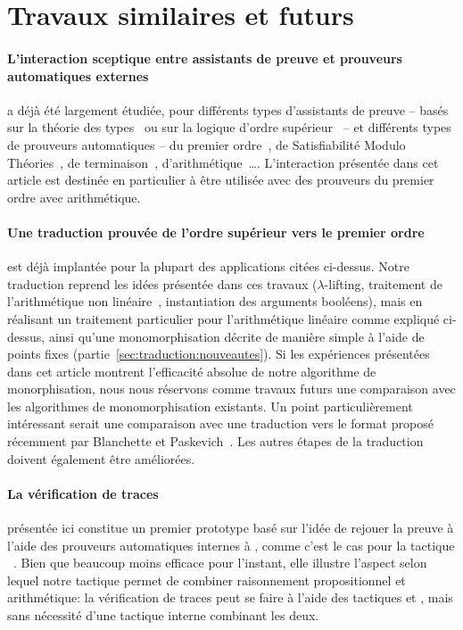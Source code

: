 \section{Travaux similaires et futurs}
\label{sec:similaires}

\paragraph{L'interaction sceptique entre assistants de preuve et
  prouveurs automatiques externes}
a déjà été largement étudiée, pour différents types d'assistants de
preuve -- basés sur la théorie des
types~\cite{DBLP:conf/cpp/ArmandFGKTW11,DBLP:conf/types/Besson06} ou sur
la logique d'ordre supérieur~\cite{Paulson10,KaliszykU12} -- et
différents types de prouveurs automatiques -- du premier
ordre~\cite{Paulson10}, de Satisfiabilité Modulo
Théories~\cite{Paulson10,DBLP:conf/cpp/ArmandFGKTW11,Bohme12}, de
terminaison~\cite{KaliszykU12},
d'arithmétique~\cite{DBLP:conf/types/Besson06}\dots. L'interaction
présentée dans cet article est destinée en particulier à être utilisée
avec des prouveurs du premier ordre avec arithmétique.

\paragraph{Une traduction prouvée de l'ordre supérieur vers le premier
  ordre}
est déjà implantée pour la plupart des applications citées ci-dessus.
Notre traduction reprend les idées présentée dans ces travaux
($\lambda$-lifting, traitement de l'arithmétique non
linéaire~\cite{Bohme12}, instantiation des arguments booléens), mais en
réalisant un traitement particulier pour l'arithmétique linéaire comme
expliqué ci-dessus, ainsi qu'une monomorphisation décrite de manière
simple à l'aide de points
fixes (partie~\ref{sec:traduction:nouveautes}). Si les expériences
présentées dans cet article montrent l'efficacité absolue de notre
algorithme de monorphisation, nous nous réservons comme travaux futurs
une comparaison avec les algorithmes de monomorphisation existants. Un
point particulièrement intéressant serait une comparaison avec une
traduction vers le format \tffone proposé récemment par Blanchette et
Paskevich~\cite{DBLP:conf/cade/BlanchetteP13}. Les autres étapes de la
traduction doivent également être améliorées.

\paragraph{La vérification de traces} présentée ici constitue un premier
prototype basé sur l'idée de rejouer la preuve à l'aide des prouveurs
automatiques internes à \holfour, comme c'est le cas pour la tactique
\sledgehammer~\cite{Paulson10}. Bien que beaucoup moins efficace pour
l'instant, elle illustre l'aspect selon lequel notre tactique permet de
combiner raisonnement propositionnel et arithmétique: la vérification de
traces peut se faire à l'aide des tactiques \metistac et \coopertac,
mais sans nécessité d'une tactique interne combinant les deux.

